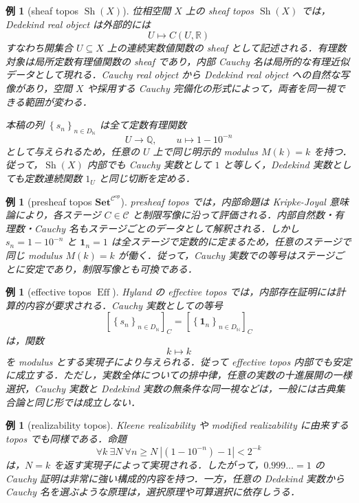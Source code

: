 \documentclass[a4paper,11pt]{ltjsarticle}
\theoremstyle{jpdef}
\newtheorem{example}[definition]{例}
\theoremstyle{jpthm}
\newcommand{\N}{\mathbb{N}}
\newcommand{\Q}{\mathbb{Q}}
\newcommand{\R}{\mathbb{R}}
\newcommand{\DN}{D_{\N}}
\newcommand{\seq}[2]{\left\{#1\right\}_{#2}}
\newcommand{\Sh}{\operatorname{Sh}}
\newcommand{\Eff}{\operatorname{Eff}}
\begin{document}
\begin{example}[sheaf topos \(\Sh(X)\)]
位相空間 \(X\) 上の sheaf topos \(\Sh(X)\) では，Dedekind real object は外部的には
\[
  U\longmapsto C(U,\R)
\]
すなわち開集合 \(U\subseteq X\) 上の連続実数値関数の sheaf として記述される．有理数対象は局所定数有理値関数の sheaf であり，内部 Cauchy 名は局所的な有理近似データとして現れる．Cauchy real object から Dedekind real object への自然な写像があり，空間 \(X\) や採用する Cauchy 完備化の形式によって，両者を同一視できる範囲が変わる．

本稿の列 \(\seq{s_n}{n\in\DN}\) は全て定数有理関数
\[
  U\to\Q,\qquad u\mapsto 1-10^{-n}
\]
として与えられるため，任意の \(U\) 上で同じ明示的 modulus \(M(k)=k\) を持つ．従って，\(\Sh(X)\) 内部でも Cauchy 実数として \(1\) と等しく，Dedekind 実数としても定数連続関数 \(1_U\) と同じ切断を定める．
\end{example}

\begin{example}[presheaf topos \(\mathbf{Set}^{\mathcal C^{op}}\)]
presheaf topos では，内部命題は Kripke-Joyal 意味論により，各ステージ \(C\in\mathcal C\) と制限写像に沿って評価される．内部自然数・有理数・Cauchy 名もステージごとのデータとして解釈される．しかし \(s_n=1-10^{-n}\) と \(\mathbf1_n=1\) は全ステージで定数的に定まるため，任意のステージで同じ modulus \(M(k)=k\) が働く．従って，Cauchy 実数での等号はステージごとに安定であり，制限写像とも可換である．
\end{example}

\begin{example}[effective topos \(\Eff\)]
Hyland の effective topos では，内部存在証明には計算的内容が要求される．Cauchy 実数としての等号
\[
  [\seq{s_n}{n\in\DN}]_C=[\seq{\mathbf1_n}{n\in\DN}]_C
\]
は，関数
\[
  k\longmapsto k
\]
を modulus とする実現子により与えられる．従って effective topos 内部でも安定に成立する．ただし，実数全体についての排中律，任意の実数の十進展開の一様選択，Cauchy 実数と Dedekind 実数の無条件な同一視などは，一般には古典集合論と同じ形では成立しない．
\end{example}

\begin{example}[realizability topos]
Kleene realizability や modified realizability に由来する topos でも同様である．命題
\[
  \forall k\ \exists N\ \forall n\ge N\ |(1-10^{-n})-1|<2^{-k}
\]
は，\(N=k\) を返す実現子によって実現される．したがって，\(0.999\ldots=1\) の Cauchy 証明は非常に強い構成的内容を持つ．一方，任意の Dedekind 実数から Cauchy 名を選ぶような原理は，選択原理や可算選択に依存しうる．
\end{example}
\end{document}
